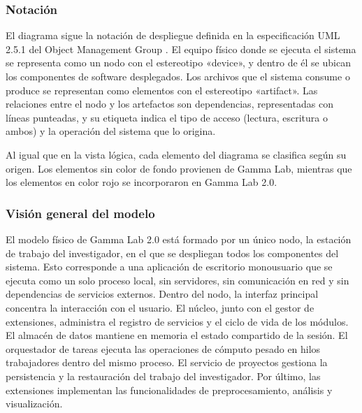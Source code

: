 \documentclass[11pt,a4paper]{article}
\DeclareRobustCommand{\_}{\textunderscore\allowbreak}
\begin{document}
\subsubsection{Notación}

El diagrama sigue la notación de despliegue definida en la especificación UML 2.5.1 del Object Management Group \cite{omg_uml}. El equipo físico donde se ejecuta el sistema se representa como un nodo con el estereotipo «device», y dentro de él se ubican los componentes de software desplegados. Los archivos que el sistema consume o produce se representan como elementos con el estereotipo «artifact». Las relaciones entre el nodo y los artefactos son dependencias, representadas con líneas punteadas, y su etiqueta indica el tipo de acceso (lectura, escritura o ambos) y la operación del sistema que lo origina.

Al igual que en la vista lógica, cada elemento del diagrama se clasifica según su origen. Los elementos sin color de fondo provienen de Gamma Lab, mientras que los elementos en color rojo se incorporaron en Gamma Lab 2.0.

\subsubsection{Visi\'on general del modelo}

El modelo físico de Gamma Lab 2.0 está formado por un único nodo, la estación de 
trabajo del investigador, en el que se despliegan todos los componentes del sistema. 
Esto corresponde a una aplicación de escritorio monousuario que se ejecuta como un 
solo proceso local, sin servidores, sin comunicación en red y sin dependencias de 
servicios externos. Dentro del nodo, la interfaz principal concentra la interacción 
con el usuario. El núcleo, junto con el gestor de extensiones, administra el registro 
de servicios y el ciclo de vida de los módulos. El almacén de datos mantiene en 
memoria el estado compartido de la sesión. El orquestador de tareas ejecuta las 
operaciones de cómputo pesado en hilos trabajadores dentro del mismo proceso. El 
servicio de proyectos gestiona la persistencia y la restauración del trabajo del 
investigador. Por último, las extensiones implementan las funcionalidades de 
preprocesamiento, análisis y visualización.
\end{document}

